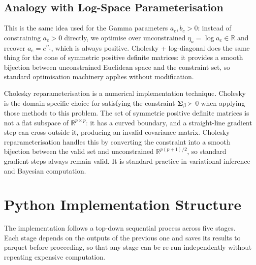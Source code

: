 \documentclass[11pt,a4paper]{article}
\newcommand{\R}{\mathbb{R}}
\begin{document}
\subsection*{Analogy with Log-Space Parameterisation}

This is the same idea used for the Gamma parameters $a_e, b_e > 0$: instead of constraining $a_e > 0$ directly, we optimise over unconstrained $\eta_a = \log a_e \in \R$ and recover $a_e = e^{\eta_a}$, which is always positive. Cholesky + log-diagonal does the same thing for the cone of symmetric positive definite matrices: it provides a smooth bijection between unconstrained Euclidean space and the constraint set, so standard optimisation machinery applies without modification.

Cholesky reparameterisation is a numerical implementation technique. Cholesky is the domain-specific choice for satisfying the constraint $\bm{\Sigma}_\beta \succ 0$ when applying those methods to this problem. The set of symmetric positive definite matrices is not a flat subspace of $\R^{p \times p}$: it has a curved boundary, and a straight-line gradient step can cross outside it, producing an invalid covariance matrix. Cholesky reparameterisation handles this by converting the constraint into a smooth bijection between the valid set and unconstrained $\R^{p(p+1)/2}$, so standard gradient steps always remain valid. It is standard practice in variational inference and Bayesian computation.


\bigskip


\section{Python Implementation Structure}
\label{app:python-code}

The implementation follows a top-down sequential process across five stages.
Each stage depends on the outputs of the previous one and saves its results to parquet before proceeding,
so that any stage can be re-run independently without repeating expensive computation.
\end{document}
